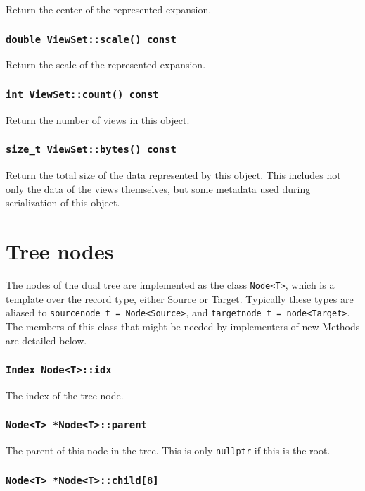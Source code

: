 Return the center of the represented expansion.

\subsubsection{\texttt{double ViewSet::scale() const}}

Return the scale of the represented expansion.

\subsubsection{\texttt{int ViewSet::count() const}}

Return the number of views in this object.

\subsubsection{\texttt{size\_t ViewSet::bytes() const}}

Return the total size of the data represented by this object. This includes
not only the data of the views themselves, but some metadata used during
serialization of this object.


\section{Tree nodes}

The nodes of the dual tree are implemented as the class \texttt{Node<T>}, which
is a template over the record type, either Source or Target. Typically these
types are aliased to \texttt{sourcenode\_t = Node<Source>}, and
\texttt{targetnode\_t = node<Target>}. The members of this class that might be
needed by implementers of new Methods are detailed below.

\subsubsection{\texttt{Index Node<T>::idx}}

The index of the tree node.

\subsubsection{\texttt{Node<T> *Node<T>::parent}}

The parent of this node in the tree. This is only \texttt{nullptr} if this is
the root.

\subsubsection{\texttt{Node<T> *Node<T>::child[8]}}

